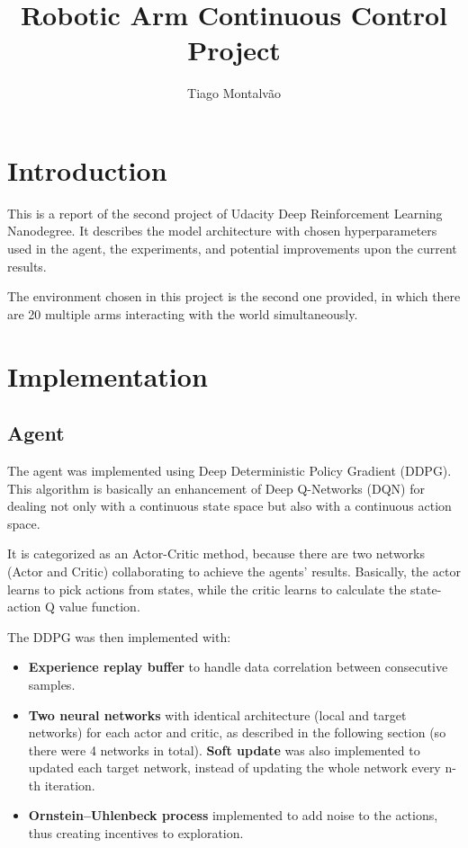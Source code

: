 \documentclass{article}
\title{Robotic Arm Continuous Control Project}
\author{Tiago Montalvão}
\begin{document}
\maketitle
\justify

\section{Introduction}

This is a report of the second project of Udacity Deep Reinforcement Learning Nanodegree. It describes the model architecture with chosen hyperparameters used in the agent, the experiments, and potential improvements upon the current results.

The environment chosen in this project is the second one provided, in which there are 20 multiple arms interacting with the world simultaneously.

\section{Implementation}
\subsection{Agent}

The agent was implemented using Deep Deterministic Policy Gradient (DDPG). This algorithm is basically an enhancement of Deep Q-Networks (DQN) for dealing not only with a continuous state space but also with a continuous action space.

It is categorized as an Actor-Critic method, because there are two networks (Actor and Critic) collaborating to achieve the agents' results. Basically, the actor learns to pick actions from states, while the critic learns to calculate the state-action Q value function.

The DDPG was then implemented with:

\begin{itemize}
    \item \textbf{Experience replay buffer} to handle data correlation between consecutive samples.
    \item \textbf{Two neural networks} with identical architecture (local and target networks) for each actor and critic, as described in the following section (so there were 4 networks in total). \textbf{Soft update} was also implemented to updated each target network, instead of updating the whole network every n-th iteration.
    \item \textbf{Ornstein–Uhlenbeck process} implemented to add noise to the actions, thus creating incentives to exploration.
\end{itemize}
\end{document}
